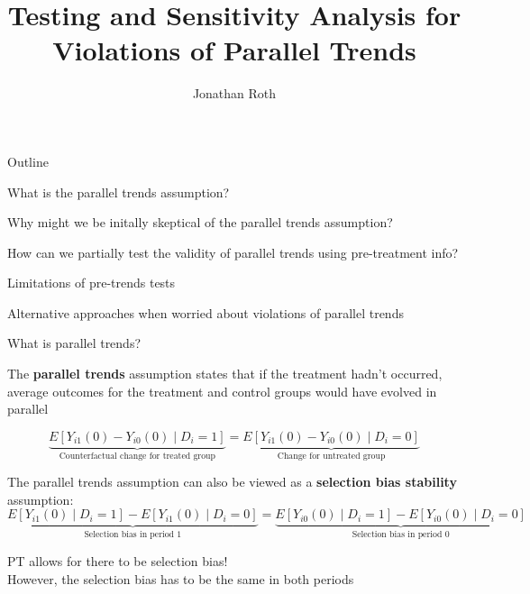 \documentclass[aspectratio = 169, 13pt]{beamer}
\author{Jonathan Roth}
\title[Pre-trends testing]{Testing and Sensitivity Analysis for Violations of Parallel Trends}
\begin{document}
\maketitle	


\begin{frame}{Outline}
	\begin{wideitemize}
		\item
		What is the parallel trends assumption? 
		
		\item
		Why might we be initally skeptical of the parallel trends assumption? 
		
		\item
		How can we partially test the validity of parallel trends using pre-treatment info? 
		
		\item
		Limitations of pre-trends tests
		
		\item
		Alternative approaches when worried about violations of parallel trends
	\end{wideitemize}
\end{frame}

\begin{frame}{What is parallel trends?}
	\begin{wideitemize}
		\item
		The \textbf{parallel trends} assumption states that if the treatment hadn't occurred, average outcomes for the treatment and control groups would have evolved in parallel
		
		$$\underbrace{ E[Y_{i1}(0) - Y_{i0}(0) \mid D_i =1] }_{\text{Counterfactual change for treated group}}= \underbrace{ E[Y_{i1}(0) - Y_{i0}(0) \mid D_i =0] }_{\text{Change for untreated group}} $$ 
		
		\pause
		\item
		The parallel trends assumption can also be viewed as a \textbf{selection bias stability} assumption:  
		$$\underbrace{ E[Y_{i1}(0)  \mid D_i =1] - E[Y_{i1}(0) \mid D_i=0] }_{\text{Selection bias in period 1}}= \underbrace{ E[Y_{i0}(0)  \mid D_i =1] - E[Y_{i0}(0) \mid D_i=0] }_{\text{Selection bias in period 0}} $$ 
		
		\pause
		\item
		PT allows for there to be selection bias!\\
		However, the selection bias has to be the same in both periods
		
	\end{wideitemize}
\end{frame}
\end{document}
